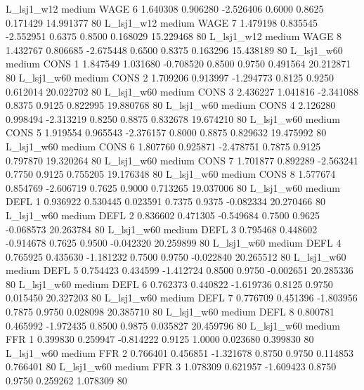     L_lsj1_w12     medium     WAGE                 6  1.640308 0.906280 -2.526406 0.6000 0.8625  0.171429   14.991377 80
    L_lsj1_w12     medium     WAGE                 7  1.479198 0.835545 -2.552951 0.6375 0.8500  0.168029   15.229468 80
    L_lsj1_w12     medium     WAGE                 8  1.432767 0.806685 -2.675448 0.6500 0.8375  0.163296   15.438189 80
    L_lsj1_w60     medium     CONS                 1  1.847549 1.031680 -0.708520 0.8500 0.9750  0.491564   20.212871 80
    L_lsj1_w60     medium     CONS                 2  1.709206 0.913997 -1.294773 0.8125 0.9250  0.612014   20.022702 80
    L_lsj1_w60     medium     CONS                 3  2.436227 1.041816 -2.341088 0.8375 0.9125  0.822995   19.880768 80
    L_lsj1_w60     medium     CONS                 4  2.126280 0.998494 -2.313219 0.8250 0.8875  0.832678   19.674210 80
    L_lsj1_w60     medium     CONS                 5  1.919554 0.965543 -2.376157 0.8000 0.8875  0.829632   19.475992 80
    L_lsj1_w60     medium     CONS                 6  1.807760 0.925871 -2.478751 0.7875 0.9125  0.797870   19.320264 80
    L_lsj1_w60     medium     CONS                 7  1.701877 0.892289 -2.563241 0.7750 0.9125  0.755205   19.176348 80
    L_lsj1_w60     medium     CONS                 8  1.577674 0.854769 -2.606719 0.7625 0.9000  0.713265   19.037006 80
    L_lsj1_w60     medium     DEFL                 1  0.936922 0.530445  0.023591 0.7375 0.9375 -0.082334   20.270466 80
    L_lsj1_w60     medium     DEFL                 2  0.836602 0.471305 -0.549684 0.7500 0.9625 -0.068573   20.263784 80
    L_lsj1_w60     medium     DEFL                 3  0.795468 0.448602 -0.914678 0.7625 0.9500 -0.042320   20.259899 80
    L_lsj1_w60     medium     DEFL                 4  0.765925 0.435630 -1.181232 0.7500 0.9750 -0.022840   20.265512 80
    L_lsj1_w60     medium     DEFL                 5  0.754423 0.434599 -1.412724 0.8500 0.9750 -0.002651   20.285336 80
    L_lsj1_w60     medium     DEFL                 6  0.762373 0.440822 -1.619736 0.8125 0.9750  0.015450   20.327203 80
    L_lsj1_w60     medium     DEFL                 7  0.776709 0.451396 -1.803956 0.7875 0.9750  0.028098   20.385710 80
    L_lsj1_w60     medium     DEFL                 8  0.800781 0.465992 -1.972435 0.8500 0.9875  0.035827   20.459796 80
    L_lsj1_w60     medium      FFR                 1  0.399830 0.259947 -0.814222 0.9125 1.0000  0.023680    0.399830 80
    L_lsj1_w60     medium      FFR                 2  0.766401 0.456851 -1.321678 0.8750 0.9750  0.114853    0.766401 80
    L_lsj1_w60     medium      FFR                 3  1.078309 0.621957 -1.609423 0.8750 0.9750  0.259262    1.078309 80
